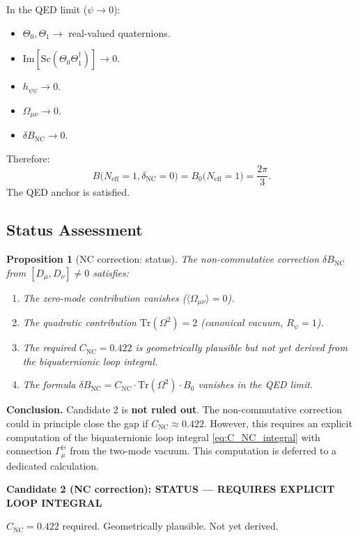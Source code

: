 \documentclass[11pt,a4paper]{article}
\newtheorem{proposition}{Proposition}
\theoremstyle{remark}
\begin{document}
In the QED limit ($\psi \to 0$):
\begin{itemize}
  \item $\Theta_0, \Theta_1 \to$ real-valued quaternions.
  \item $\mathrm{Im}[\mathrm{Sc}(\Theta_0 \Theta_1^\dagger)] \to 0$.
  \item $h_{\psi\psi} \to 0$.
  \item $\Omega_{\mu\nu} \to 0$.
  \item $\delta B_{\mathrm{NC}} \to 0$.
\end{itemize}
Therefore:
\begin{equation}
  B\bigl(N_{\mathrm{eff}} = 1, \delta_{\mathrm{NC}} = 0\bigr)
  = B_0\bigl(N_{\mathrm{eff}} = 1\bigr) = \frac{2\pi}{3}.
  \label{eq:qed_limit_C2}
\end{equation}
The QED anchor is satisfied. \checkmark

\subsection{Status Assessment}

\begin{proposition}[NC correction: status]
\label{prop:NC_status}
The non-commutative correction $\delta B_{\mathrm{NC}}$ from $[D_\mu, D_\nu] \neq 0$ satisfies:
\begin{enumerate}
  \item The zero-mode contribution vanishes ($\langle \Omega_{\mu\nu} \rangle = 0$).
  \item The quadratic contribution $\mathrm{Tr}(\Omega^2) = 2$ (canonical vacuum, $R_\psi = 1$).
  \item The required $C_{\mathrm{NC}} = 0.422$ is geometrically plausible but \emph{not yet derived}
    from the biquaternionic loop integral.
  \item The formula $\delta B_{\mathrm{NC}} = C_{\mathrm{NC}} \cdot \mathrm{Tr}(\Omega^2) \cdot B_0$
    vanishes in the QED limit.
\end{enumerate}
\end{proposition}

\textbf{Conclusion.} Candidate 2 is \textbf{not ruled out}. The non-commutative correction
could in principle close the gap if $C_{\mathrm{NC}} \approx 0.422$. However, this requires an
explicit computation of the biquaternionic loop integral \eqref{eq:C_NC_integral} with
connection $\Gamma_\mu^{\mathbb{H}}$ from the two-mode vacuum. This computation is deferred
to a dedicated calculation.

\begin{center}
\textbf{Candidate 2 (NC correction): STATUS — REQUIRES EXPLICIT LOOP INTEGRAL}

$C_{\mathrm{NC}} = 0.422$ required. Geometrically plausible. Not yet derived.
\end{center}

\ifdefined\INCLUDEMODE\else
\end{document}
